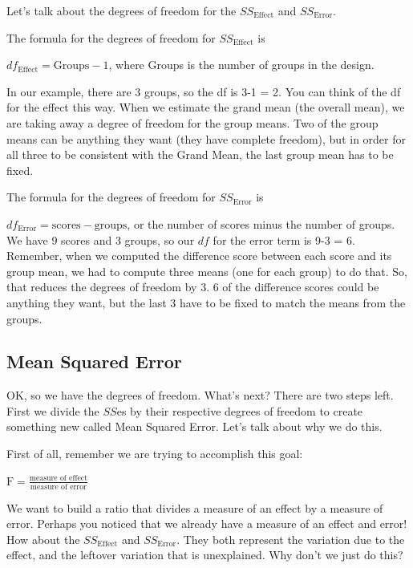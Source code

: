 \documentclass[
  letterpaper,
  DIV=11,
  numbers=noendperiod]{scrreprt}
\begin{document}
Let's talk about the degrees of freedom for the \(SS_\text{Effect}\) and
\(SS_\text{Error}\).

The formula for the degrees of freedom for \(SS_\text{Effect}\) is

\(df_\text{Effect} = \text{Groups} -1\), where Groups is the number of
groups in the design.

In our example, there are 3 groups, so the df is 3-1 = 2. You can think
of the df for the effect this way. When we estimate the grand mean (the
overall mean), we are taking away a degree of freedom for the group
means. Two of the group means can be anything they want (they have
complete freedom), but in order for all three to be consistent with the
Grand Mean, the last group mean has to be fixed.

The formula for the degrees of freedom for \(SS_\text{Error}\) is

\(df_\text{Error} = \text{scores} - \text{groups}\), or the number of
scores minus the number of groups. We have 9 scores and 3 groups, so our
\(df\) for the error term is 9-3 = 6. Remember, when we computed the
difference score between each score and its group mean, we had to
compute three means (one for each group) to do that. So, that reduces
the degrees of freedom by 3. 6 of the difference scores could be
anything they want, but the last 3 have to be fixed to match the means
from the groups.

\subsection{Mean Squared Error}\label{mean-squared-error}

OK, so we have the degrees of freedom. What's next? There are two steps
left. First we divide the \(SS\)es by their respective degrees of
freedom to create something new called Mean Squared Error. Let's talk
about why we do this.

First of all, remember we are trying to accomplish this goal:

\(\text{F} = \frac{\text{measure of effect}}{\text{measure of error}}\)

We want to build a ratio that divides a measure of an effect by a
measure of error. Perhaps you noticed that we already have a measure of
an effect and error! How about the \(SS_\text{Effect}\) and
\(SS_\text{Error}\). They both represent the variation due to the
effect, and the leftover variation that is unexplained. Why don't we
just do this?
\end{document}
